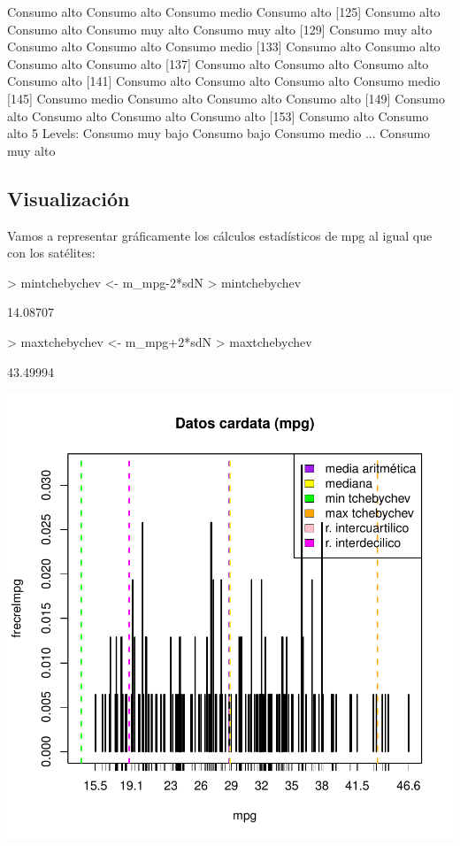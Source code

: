 \documentclass [a4paper] {article}
\begin{document}
\begin{Schunk}
\begin{Soutput}
[121] Consumo alto     Consumo alto     Consumo medio    Consumo alto    
[125] Consumo alto     Consumo alto     Consumo muy alto Consumo muy alto
[129] Consumo muy alto Consumo alto     Consumo alto     Consumo medio   
[133] Consumo alto     Consumo alto     Consumo alto     Consumo alto    
[137] Consumo alto     Consumo alto     Consumo alto     Consumo alto    
[141] Consumo alto     Consumo alto     Consumo alto     Consumo medio   
[145] Consumo medio    Consumo alto     Consumo alto     Consumo alto    
[149] Consumo alto     Consumo alto     Consumo alto     Consumo alto    
[153] Consumo alto     Consumo alto    
5 Levels: Consumo muy bajo Consumo bajo Consumo medio ... Consumo muy alto
\end{Soutput}
\end{Schunk}

\subsection{Visualización}
Vamos a representar gráficamente los cálculos estadísticos de mpg al igual que con los satélites:

\begin{Schunk}
\begin{Sinput}
> mintchebychev <- m_mpg-2*sdN
> mintchebychev
\end{Sinput}
\begin{Soutput}
[1] 14.08707
\end{Soutput}
\begin{Sinput}
> maxtchebychev <- m_mpg+2*sdN
> maxtchebychev
\end{Sinput}
\begin{Soutput}
[1] 43.49994
\end{Soutput}
\end{Schunk}
\includegraphics{Memoria-Figura 2}
\end{document}
